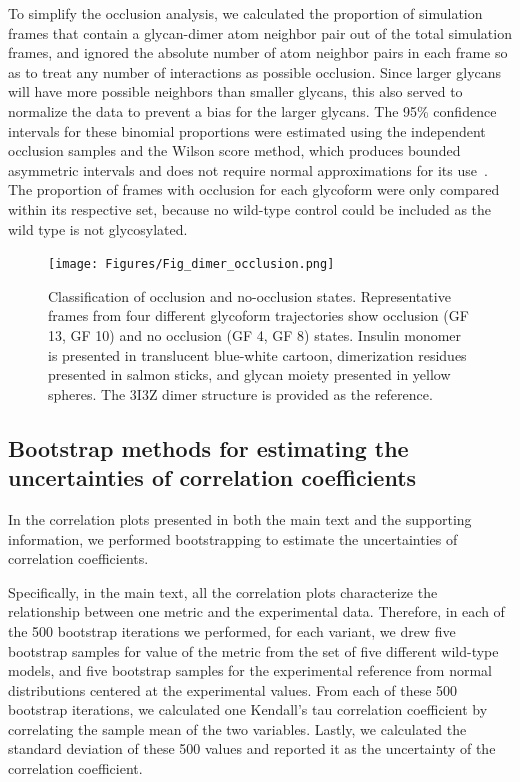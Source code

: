 \documentclass[sn-vancouver]{sn-jnl}
\begin{document}
To simplify the occlusion analysis, we calculated the proportion of simulation frames that contain a glycan-dimer atom neighbor pair out of the total simulation frames, and ignored the absolute number of atom neighbor pairs in each frame so as to treat any number of interactions as possible occlusion. Since larger glycans will have more possible neighbors than smaller glycans, this also served to normalize the data to prevent a bias for the larger glycans. The 95\% confidence intervals for these binomial proportions were estimated using the independent occlusion samples and the Wilson score method, which produces bounded asymmetric intervals and does not require normal approximations for its use~\cite{wilson1927score, newcombe1998intervals, wallis2013binomialscores}. The proportion of frames with occlusion for each glycoform were only compared within its respective set, because no wild-type control could be included as the wild type is not glycosylated.

\begin{figure}[H]
\centering
\texttt{[image: Figures/Fig\_dimer\_occlusion.png]}
\caption{Classification of occlusion and no-occlusion states. Representative frames from four different glycoform trajectories show occlusion (GF 13, GF 10) and no occlusion (GF 4, GF 8) states. Insulin monomer is presented in translucent blue-white cartoon, dimerization residues presented in salmon sticks, and glycan moiety presented in yellow spheres. The 3I3Z dimer structure is provided as the reference.}
\label{occlusion}
\end{figure}

\subsection{Bootstrap methods for estimating the uncertainties of correlation coefficients} \label{bootstrap}
In the correlation plots presented in both the main text and the supporting information, we performed bootstrapping to estimate the uncertainties of correlation coefficients. 

Specifically, in the main text, all the correlation plots characterize the relationship between one metric and the experimental data. Therefore, in each of the 500 bootstrap iterations we performed, for each variant, we drew five bootstrap samples for value of the metric from the set of five different wild-type models, and five bootstrap samples for the experimental reference from normal distributions centered at the experimental values. From each of these 500 bootstrap iterations, we calculated one Kendall's tau correlation coefficient by correlating the sample mean of the two variables. Lastly, we calculated the standard deviation of these 500 values and reported it as the uncertainty of the correlation coefficient. 
\end{document}
